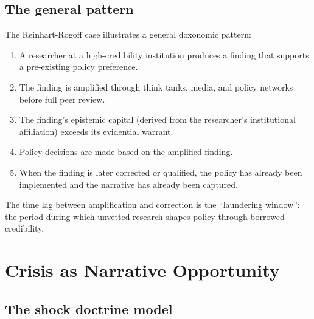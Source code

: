 \subsection{The general pattern}

The Reinhart-Rogoff case illustrates a general doxonomic pattern:

\begin{model}
\label{mod:credibility-laundering}
\begin{enumerate}[nosep]
  \item A researcher at a high-credibility institution produces a finding that supports a pre-existing policy preference.
  \item The finding is amplified through think tanks, media, and policy networks before full peer review.
  \item The finding's epistemic capital (derived from the researcher's institutional affiliation) exceeds its evidential warrant.
  \item Policy decisions are made based on the amplified finding.
  \item When the finding is later corrected or qualified, the policy has already been implemented and the narrative has already been captured.
\end{enumerate}
The time lag between amplification and correction is the ``laundering window'': the period during which unvetted research shapes policy through borrowed credibility.
\end{model}

\section{Crisis as Narrative Opportunity}
\label{sec:ch25-crisis}

\subsection{The shock doctrine model}

